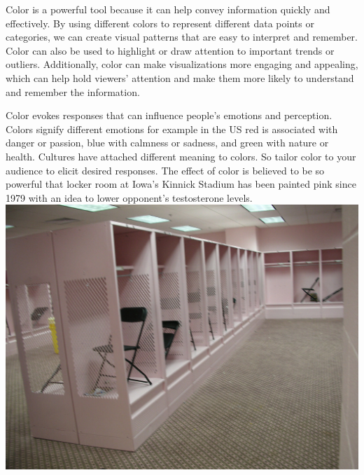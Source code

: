 \documentclass[
  letterpaper,
]{book}
\begin{document}
Color is a powerful tool because it can help convey information quickly
and effectively. By using different colors to represent different data
points or categories, we can create visual patterns that are easy to
interpret and remember. Color can also be used to highlight or draw
attention to important trends or outliers. Additionally, color can make
visualizations more engaging and appealing, which can help hold viewers'
attention and make them more likely to understand and remember the
information.

Color evokes responses that can influence people's emotions and
perception. Colors signify different emotions for example in the US red
is associated with danger or passion, blue with calmness or sadness, and
green with nature or health. Cultures have attached different meaning to
colors. So tailor color to your audience to elicit desired responses.
The effect of color is believed to be so powerful that locker room at
Iowa's Kinnick Stadium has been painted pink since 1979 with an idea to
lower opponent's testosterone levels.
\includegraphics{./images/Kinnick_Stadium_Pink.jpeg}
\end{document}
